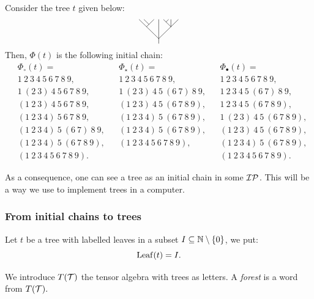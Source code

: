 \begin{Eg}
	Consider the tree $t$ given below:
	\[
	\raisebox{-0.5\height}{\begin{tikzpicture}[line cap=round,line join=round,x=0.2cm,y=0.2cm]
			\draw (0,0)--(0,5);
			\draw (0,1)--(-4,5);
			\draw (-2.5,3.5)--(-1,5);
			\draw (-2,4)--(-3,5);
			\draw (0,1)--(4,5);
			\draw (2.5,3.5)--(2.5,5);
			\draw (2.5,3.5)--(1,5);
			\draw (1.5,4.5) -- (2,5);
	\end{tikzpicture}}
	\]
	Then, $\Phi(t)$ is the following initial chain:
	\begin{align*}
		& \Phi_{\circ}(t)= &&	\Phi_{\star}(t)= && \Phi_{\bullet}(t)= \\
		&1~2~3~4~5~6~7~8~9, &&  1~2~3~4~5~6~7~8~9, && 1~2~3~4~5~6~7~8~9, \\ 
		&1~(2~3)~4~5~6~7~8~9, && 1~(2~3)~4~5~(6~7)~8~9, && 1~2~3~4~5~(6~7)~8~9,\\
		&(1~2~3)~4~5~6~7~8~9, && (1~2~3)~4~5~(6~7~8~9), && 1~2~3~4~5~(6~7~8~9),\\
		&(1~2~3~4)~5~6~7~8~9, && (1~2~3~4)~5~(6~7~8~9), &&  1~(2~3)~4~5~(6~7~8~9),\\
		&(1~2~3~4)~5~(6~7)~8~9, && (1~2~3~4)~5~(6~7~8~9), && (1~2~3)~4~5~(6~7~8~9),\\
		&(1~2~3~4)~5~(6~7~8~9), && (1~2~3~4~5~6~7~8~9), && (1~2~3~4)~5~(6~7~8~9),\\
		&(1~2~3~4~5~6~7~8~9). &&						&& (1~2~3~4~5~6~7~8~9).
	\end{align*} 
\end{Eg}
As a consequence, one can see a \Sch{} tree as an initial chain in some $\mathcal{IP}_{}$. This will be a way we use to implement \Sch{} trees in a computer.

\subsubsection{From initial chains to trees}

\begin{Not}
	Let $t$ be a tree with labelled leaves in a subset $I\subseteq \mathbb{N}\setminus\{0\}$, we put:
	\[
	\operatorname{Leaf}(t)=I.
	\]
\end{Not}

\begin{defi}
	We introduce $T(\operatorname{\mathcal{T}})$ the tensor algebra with trees as letters. A \emph{forest} is a word from $T(\operatorname{\mathcal{T}}).$
\end{defi}

